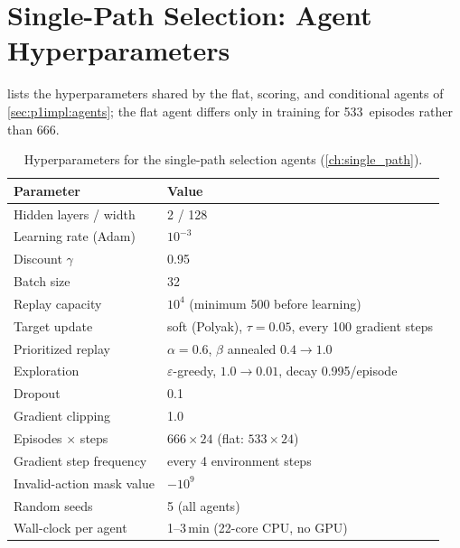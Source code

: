 \section{Single-Path Selection: Agent Hyperparameters}
\label{app:p1hyper}

 lists the hyperparameters shared by the flat, scoring, and conditional agents of
\cref{sec:p1impl:agents}; the flat agent differs only in training for 533~episodes rather than 666.

\begin{table}[h]
  \centering
  \caption[Hyperparameters for the single-path agents]{Hyperparameters for the single-path selection agents (\cref{ch:single_path}).}
  \label{tab:app:p1hyper}
  \begin{tabular}{ll}
    \toprule
    Parameter & Value \\
    \midrule
    Hidden layers / width          & 2 / 128 \\
    Learning rate (Adam)           & $10^{-3}$ \\
    Discount $\gamma$              & 0.95 \\
    Batch size                     & 32 \\
    Replay capacity                & $10^4$ (minimum 500 before learning) \\
    Target update                  & soft (Polyak), $\tau = 0.05$, every 100 gradient steps \\
    Prioritized replay             & $\alpha = 0.6$, $\beta$ annealed $0.4 \rightarrow 1.0$ \\
    Exploration                    & $\varepsilon$-greedy, $1.0 \rightarrow 0.01$, decay 0.995/episode \\
    Dropout                        & 0.1 \\
    Gradient clipping              & 1.0 \\
    Episodes $\times$ steps        & $666 \times 24$ (flat: $533 \times 24$) \\
    Gradient step frequency        & every 4 environment steps \\
    Invalid-action mask value      & $-10^{9}$ \\
    Random seeds                   & 5 (all agents) \\
    Wall-clock per agent           & 1--3\,min (22-core CPU, no GPU) \\
    \bottomrule
  \end{tabular}
\end{table}

